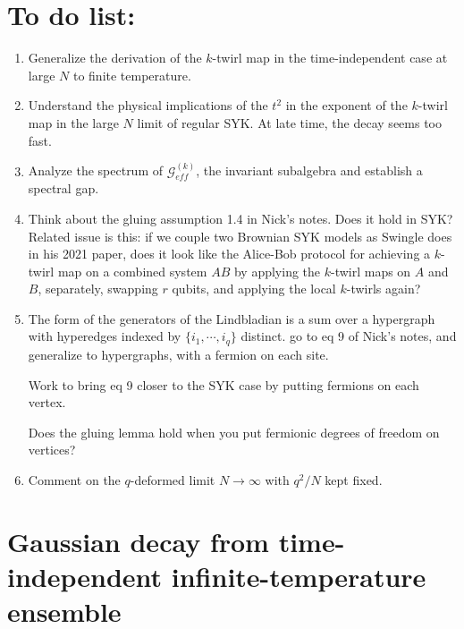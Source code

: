 \documentclass{article}
\theoremstyle{definition}
\begin{document}
    \section{To do list:}
    \begin{enumerate}
        \item Generalize the derivation of the $k$-twirl map in the time-independent case at large $N$ to finite temperature.

        \item Understand the physical implications of the $t^{2}$ in the exponent
            of the $k$-twirl map in the large $N$ limit of regular SYK. At late
            time, the decay seems too fast.

        \item Analyze the spectrum of $\mathcal{G}_{eff}^{(k)}$, the invariant subalgebra and establish a spectral gap.

        \item Think about the gluing assumption 1.4 in Nick's notes. Does it
            hold in SYK? Related issue is this: if we couple two Brownian SYK
            models as Swingle does in his 2021 paper, does it look like the Alice-Bob
            protocol for achieving a $k$-twirl map on a combined system $AB$ by applying
            the $k$-twirl maps on $A$ and $B$, separately, swapping $r$ qubits,
            and applying the local $k$-twirls again?

        \item The form of the generators of the Lindbladian is a sum over a hypergraph with hyperedges indexed by $\{i_1,\cdots ,i_q\}$ distinct. go to eq 9 of Nick's notes, and generalize to hypergraphs, with a fermion on each site. 

    Work to bring eq 9 closer to the SYK case by putting fermions on each vertex. 

    Does the gluing lemma hold when you put fermionic degrees of freedom on vertices?

    \item Comment on the $q$-deformed limit $N\to \infty$ with $q^{2}/N$ kept fixed.

    \end{enumerate}



    \section{Gaussian decay from time-independent infinite-temperature ensemble}
\end{document}
